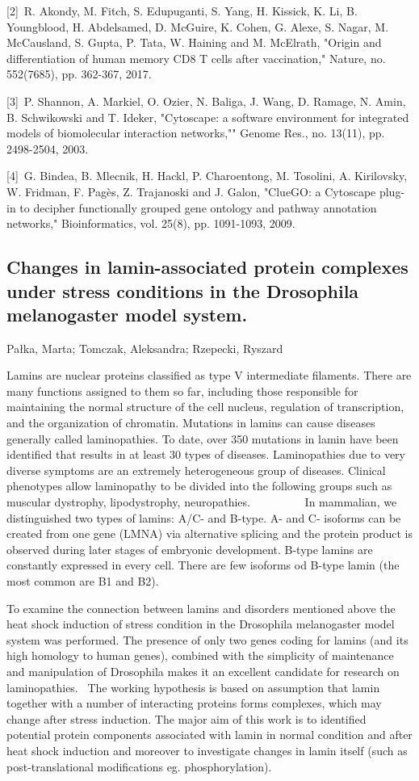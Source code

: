 {[2] R. Akondy, M. Fitch, S. Edupuganti, S. Yang, H. Kissick, K. Li, B. Youngblood, H. Abdelsamed, D. McGuire, K. Cohen, G. Alexe, S. Nagar, M. McCausland, S. Gupta, P. Tata, W. Haining and M. McElrath, "Origin and differentiation of human memory CD8 T cells after vaccination," Nature, no. 552(7685), pp. 362-367, 2017.

[3] P. Shannon, A. Markiel, O. Ozier, N. Baliga, J. Wang, D. Ramage, N. Amin, B. Schwikowski and T. Ideker, "Cytoscape: a software environment for integrated models of biomolecular interaction networks,"" Genome Res., no. 13(11), pp. 2498-2504, 2003.

[4] G. Bindea, B. Mlecnik, H. Hackl, P. Charoentong, M. Tosolini, A. Kirilovsky, W. Fridman, F. Pagès, Z. Trajanoski and J. Galon, "ClueGO: a Cytoscape plug-in to decipher functionally grouped gene ontology and pathway annotation networks," Bioinformatics, vol. 25(8), pp. 1091-1093, 2009.


\subsection*{\color{eubicRed} Changes in lamin-associated protein complexes under stress conditions in the Drosophila melanogaster model system.}
{\color{eubicGray}Pałka, Marta;
Tomczak, Aleksandra;
Rzepecki, Ryszard}

Lamins are nuclear proteins classified as type V intermediate filaments. There are many functions assigned to them so far, including those responsible for maintaining the normal structure of the cell nucleus, regulation of transcription, and the organization of chromatin. Mutations in lamins can cause diseases generally called laminopathies. To date, over 350 mutations in lamin have been identified that results in at least 30 types of diseases. Laminopathies due to very diverse symptoms are an extremely heterogeneous group of diseases. Clinical phenotypes allow laminopathy to be divided into the following groups such as muscular dystrophy, lipodystrophy, neuropathies.          In mammalian, we distinguished two types of lamins: A/C- and B-type. A- and C- isoforms can be created from one gene (LMNA) via alternative splicing and the protein product is observed during later stages of embryonic development. B-type lamins are constantly expressed in every cell. There are few isoforms od B-type lamin (the most common are B1 and B2).

To examine the connection between lamins and disorders mentioned above the heat shock induction of stress condition in the Drosophila melanogaster model system was performed. The presence of only two genes coding for lamins (and its high homology to human genes), combined with the simplicity of maintenance and manipulation of Drosophila makes it an excellent candidate for research on laminopathies.  The working hypothesis is based on assumption that lamin together with a number of interacting proteins forms complexes, which may change after stress induction. The major aim of this work is to identified potential protein components associated with lamin in normal condition and after heat shock induction and moreover to investigate changes in lamin itself (such as post-translational modifications eg. phosphorylation).

}
